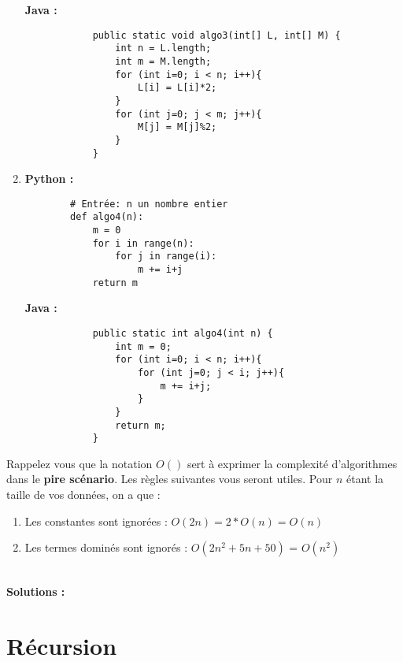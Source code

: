 \begin{Exercice}[20 minutes]
\begin{enumerate}
        \textbf{Java :}
        \begin{verbatim}
            public static void algo3(int[] L, int[] M) {
                int n = L.length;
                int m = M.length;
                for (int i=0; i < n; i++){
                    L[i] = L[i]*2;
                }
                for (int j=0; j < m; j++){
                    M[j] = M[j]%2;
                }
            }
        \end{verbatim}
        
        \item \textbf{Python :}
        \begin{verbatim}
        # Entrée: n un nombre entier
        def algo4(n):
            m = 0
            for i in range(n):
                for j in range(i):
                    m += i+j
            return m
        \end{verbatim}
        
        \textbf{Java :}
        \begin{verbatim}
            public static int algo4(int n) {
                int m = 0;
                for (int i=0; i < n; i++){
                    for (int j=0; j < i; j++){
                        m += i+j;
                    }
                }
                return m;
            }
        \end{verbatim}
    \end{enumerate}
    
    \begin{conseil}
    Rappelez vous que la notation $O()$ sert à exprimer la complexité d'algorithmes dans le \textbf{pire scénario}. Les règles suivantes vous seront utiles. Pour $n$ étant la taille de vos données, on a que :
    \begin{enumerate}
        \item Les constantes sont ignorées : $O(2n) = 2*O(n) = O(n)$ 
        \item Les termes dominés sont ignorés : $O(2n^2+5n+50)$ = $O(n^2)$
    \end{enumerate}
    \end{conseil}
    \ \\
    \textbf{Solutions :}
    
    
\end{Exercice}

\section{Récursion}

